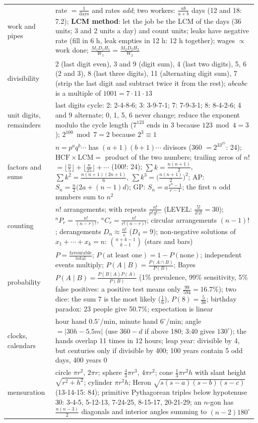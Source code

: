 \documentclass[10pt,a4paper,openany,oneside]{report}
\begin{document}
\begin{center}
\begin{xltabular}{\textwidth}{@{}L{2.9cm}Y@{}}
work and pipes & rate $=\frac1{\text{days}}$ and rates \emph{add}; two workers: $\frac{ab}{a+b}$ days (12 and 18: 7.2); \textbf{LCM method}: let the job be the LCM of the days (36 units; 3 and 2 units a day) and count units; leaks have negative rate (fill in 6 h, leak empties in 12 h: 12 h together); wages $\propto$ work done; $\frac{M_1D_1H_1}{W_1}=\frac{M_2D_2H_2}{W_2}$\\
divisibility & 2 (last digit even), 3 and 9 (digit sum), 4 (last two digits), 5, 6 (2 and 3), 8 (last three digits), 11 (alternating digit sum), 7 (strip the last digit and subtract twice it from the rest); $abcabc$ is a multiple of $1001=7\cdot11\cdot13$\\
unit digits, remainders & last digits cycle: 2: 2-4-8-6; 3: 3-9-7-1; 7: 7-9-3-1; 8: 8-4-2-6; 4 and 9 alternate; 0, 1, 5, 6 never change; reduce the exponent modulo the cycle length ($7^{123}$ ends in 3 because $123\bmod4=3$); $2^{100}\bmod7=2$ because $2^3\equiv1$\\
factors and sums & $n=p^aq^b\cdots$ has $(a+1)(b+1)\cdots$ divisors (360 $=2^33^25$: 24); $\text{HCF}\times\text{LCM}=$ product of the two numbers; trailing zeros of $n!$ $=\lfloor\frac n5\rfloor+\lfloor\frac n{25}\rfloor+\cdots$ (100!: 24); $\sum k=\frac{n(n+1)}2$, $\sum k^2=\frac{n(n+1)(2n+1)}6$, $\sum k^3=\big(\frac{n(n+1)}2\big)^2$; AP: $S_n=\frac n2\big(2a+(n-1)d\big)$; GP: $S_n=a\frac{r^n-1}{r-1}$; the first $n$ odd numbers sum to $n^2$\\
counting & $n!$ arrangements; with repeats $\frac{n!}{p!\,q!\cdots}$ (LEVEL: $\frac{5!}{2!2!}=30$); $^nP_r=\frac{n!}{(n-r)!}$, $^nC_r=\frac{n!}{r!(n-r)!}$; circular arrangements $(n-1)!$; derangements $D_n\approx\frac{n!}e$ ($D_4=9$); non-negative solutions of $x_1+\cdots+x_k=n$: $\binom{n+k-1}{k-1}$ (stars and bars)\\
probability & $P=\frac{\text{favourable}}{\text{total}}$; $P(\text{at least one})=1-P(\text{none})$; independent events multiply; $P(A\mid B)=\frac{P(A\cap B)}{P(B)}$; Bayes $P(A\mid B)=\frac{P(B\mid A)P(A)}{P(B)}$ (1\% prevalence, 99\% sensitivity, 5\% false positives: a positive test means only $\frac{99}{594}=16.7\%$); two dice: the sum 7 is the most likely ($\frac16$), $P(8)=\frac5{36}$; birthday paradox: 23 people give 50.7\%; expectation is linear\\
clocks, calendars & hour hand $0.5^\circ$/min, minute hand $6^\circ$/min; angle $=|30h-5.5m|$ (use $360-d$ if above 180; 3:40 gives $130^\circ$); the hands overlap 11 times in 12 hours; leap year: divisible by 4, but centuries only if divisible by 400; 100 years contain 5 odd days, 400 years 0\\
mensuration & circle $\pi r^2$, $2\pi r$; sphere $\frac43\pi r^3$, $4\pi r^2$; cone $\frac13\pi r^2h$ with slant height $\sqrt{r^2+h^2}$; cylinder $\pi r^2h$; Heron $\sqrt{s(s-a)(s-b)(s-c)}$ (13-14-15: 84); primitive Pythagorean triples below hypotenuse 30: 3-4-5, 5-12-13, 7-24-25, 8-15-17, 20-21-29; an $n$-gon has $\frac{n(n-3)}2$ diagonals and interior angles summing to $(n-2)180^\circ$\\
\bottomrule
\end{xltabular}
\end{center}
\end{document}
